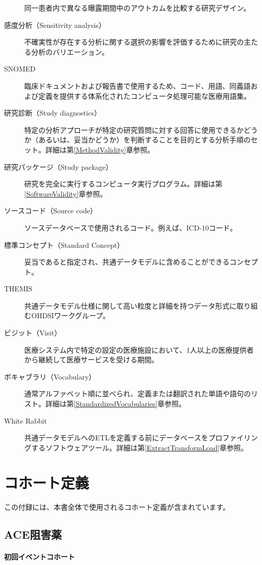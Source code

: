 \documentclass[
  11pt]{book}
\theoremstyle{definition}
\theoremstyle{definition}
\theoremstyle{definition}
\theoremstyle{definition}
\theoremstyle{remark}
\begin{document}
\begin{description}
同一患者内で異なる曝露期間中のアウトカムを比較する研究デザイン。
\item[感度分析（Sensitivity analysis）]
不確実性が存在する分析に関する選択の影響を評価するために研究の主たる分析のバリエーション。
\item[SNOMED]
臨床ドキュメントおよび報告書で使用するため、コード、用語、同義語および定義を提供する体系化されたコンピュータ処理可能な医療用語集。
\item[研究診断（Study diagnostics）]
特定の分析アプローチが特定の研究質問に対する回答に使用できるかどうか（あるいは、妥当かどうか）を判断することを目的とする分析手順のセット。詳細は第\ref{MethodValidity}章参照。
\item[研究パッケージ（Study package）]
研究を完全に実行するコンピュータ実行プログラム。詳細は第\ref{SoftwareValidity}章参照。
\item[ソースコード（Source code）]
ソースデータベースで使用されるコード。例えば、ICD-10コード。
\item[標準コンセプト（Standard Concept）]
妥当であると指定され、共通データモデルに含めることができるコンセプト。
\item[THEMIS]
共通データモデル仕様に関して高い粒度と詳細を持つデータ形式に取り組むOHDSIワークグループ。
\item[ビジット（Visit）]
医療システム内で特定の設定の医療施設において、1人以上の医療提供者から継続して医療サービスを受ける期間。
\item[ボキャブラリ（Vocabulary）]
通常アルファベット順に並べられ、定義または翻訳された単語や語句のリスト。詳細は第\ref{StandardizedVocabularies}章参照。
\item[White Rabbit]
共通データモデルへのETLを定義する前にデータベースをプロファイリングするソフトウェアツール。詳細は第\ref{ExtractTransformLoad}章参照。
\end{description}

\chapter{コホート定義}\label{CohortDefinitions}

この付録には、本書全体で使用されるコホート定義が含まれています。

\section{ACE阻害薬}\label{AceInhibitors}

\subsubsection*{初回イベントコホート}\label{ux521dux56deux30a4ux30d9ux30f3ux30c8ux30b3ux30dbux30fcux30c8}
\end{document}
